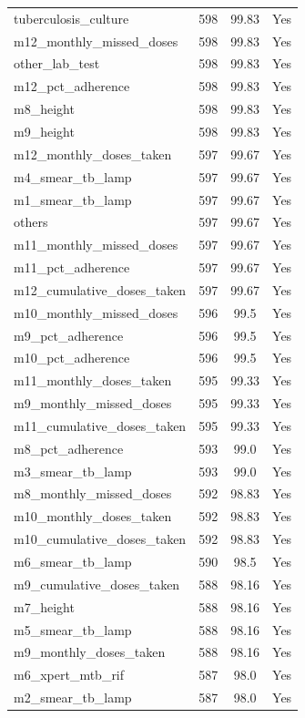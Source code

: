 \begin{longtable}[l]{>{\raggedright\arraybackslash}p{}cc>{\centering\arraybackslash}p{}}
tuberculosis\_culture & 598 & 99.83 & Yes \\
m12\_monthly\_missed\_doses & 598 & 99.83 & Yes \\
other\_lab\_test & 598 & 99.83 & Yes \\
m12\_pct\_adherence & 598 & 99.83 & Yes \\
m8\_height & 598 & 99.83 & Yes \\
m9\_height & 598 & 99.83 & Yes \\
m12\_monthly\_doses\_taken & 597 & 99.67 & Yes \\
m4\_smear\_tb\_lamp & 597 & 99.67 & Yes \\
m1\_smear\_tb\_lamp & 597 & 99.67 & Yes \\
others & 597 & 99.67 & Yes \\
m11\_monthly\_missed\_doses & 597 & 99.67 & Yes \\
m11\_pct\_adherence & 597 & 99.67 & Yes \\
m12\_cumulative\_doses\_taken & 597 & 99.67 & Yes \\
m10\_monthly\_missed\_doses & 596 & 99.5 & Yes \\
m9\_pct\_adherence & 596 & 99.5 & Yes \\
m10\_pct\_adherence & 596 & 99.5 & Yes \\
m11\_monthly\_doses\_taken & 595 & 99.33 & Yes \\
m9\_monthly\_missed\_doses & 595 & 99.33 & Yes \\
m11\_cumulative\_doses\_taken & 595 & 99.33 & Yes \\
m8\_pct\_adherence & 593 & 99.0 & Yes \\
m3\_smear\_tb\_lamp & 593 & 99.0 & Yes \\
m8\_monthly\_missed\_doses & 592 & 98.83 & Yes \\
m10\_monthly\_doses\_taken & 592 & 98.83 & Yes \\
m10\_cumulative\_doses\_taken & 592 & 98.83 & Yes \\
m6\_smear\_tb\_lamp & 590 & 98.5 & Yes \\
m9\_cumulative\_doses\_taken & 588 & 98.16 & Yes \\
m7\_height & 588 & 98.16 & Yes \\
m5\_smear\_tb\_lamp & 588 & 98.16 & Yes \\
m9\_monthly\_doses\_taken & 588 & 98.16 & Yes \\
m6\_xpert\_mtb\_rif & 587 & 98.0 & Yes \\
m2\_smear\_tb\_lamp & 587 & 98.0 & Yes \\

\end{longtable}
